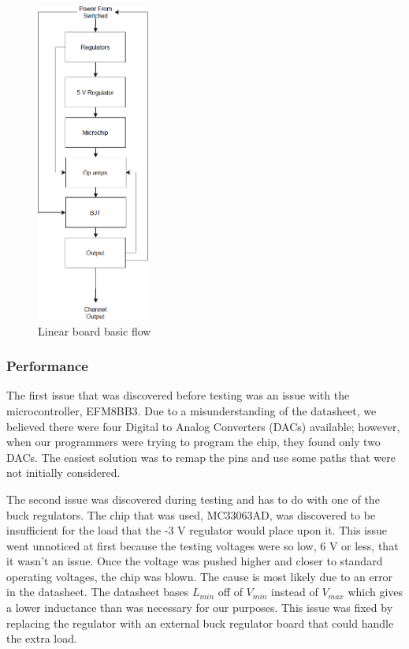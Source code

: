 \documentclass[15pt]{article}
\begin{document}
\begin{figure}
    \begin{center}
      \includegraphics[width=0.33\textwidth]{chase7}
    \end{center}
    \caption{Linear board basic flow}
    \label{fig:chase7}
  \end{figure}
\subsubsection{Performance}
The first issue that was discovered before testing was an issue with the microcontroller, EFM8BB3. Due to a misunderstanding of the datasheet, we believed there were four Digital to Analog Converters (DACs) available; however, when our programmers were trying to program the chip, they found only two DACs. The easiest solution was to remap the pins and use some paths that were not initially considered.
    
The second issue was discovered during testing and has to do with one of the buck regulators. The chip that was used, MC33063AD, was discovered to be insufficient for the load that the -3 V regulator would place upon it. This issue went unnoticed at first because the testing voltages were so low, 6 V or less, that it wasn’t an issue. Once the voltage was pushed higher and closer to standard operating voltages, the chip was blown. The cause is most likely due to an error in the datasheet. The datasheet bases $L_{min}$ off of $V_{min}$ instead of $V_{max}$ which gives a lower inductance than was necessary for our purposes. This issue was fixed by replacing the regulator with an external buck regulator board that could handle the extra load.
\end{document}

